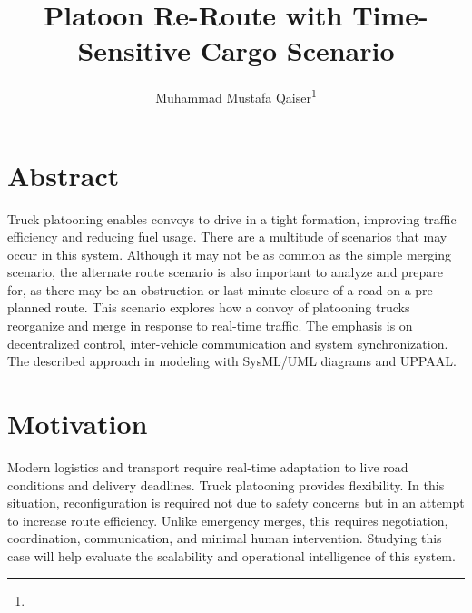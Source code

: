 \documentclass[english]{lni}
\begin{document}
\title[Titlel]{Platoon Re-Route with Time-Sensitive Cargo Scenario}
\author[Mu]{Muhammad Mustafa Qaiser\footnote{ } }

\maketitle
\tableofcontents


\newpage
\section{Abstract} 
Truck platooning enables convoys to drive in a tight formation, improving traffic efficiency and reducing fuel usage. \cite{10933391} There are a multitude of scenarios that may occur in this system. Although it may not be as common as the simple merging scenario, the alternate route scenario is also important to analyze and prepare for, as there may be an obstruction or last minute closure of a road on a pre planned route. This scenario explores how a convoy of platooning trucks reorganize and merge in response to real-time traffic. The emphasis is on decentralized control, inter-vehicle communication and system synchronization. The described approach in modeling with SysML/UML diagrams and UPPAAL. 

\section{Motivation}
Modern logistics and transport require real-time adaptation to live road conditions and delivery deadlines. Truck platooning provides flexibility. In this situation, reconfiguration is required not due to safety concerns but in an attempt to increase route efficiency. Unlike emergency merges, this requires negotiation, coordination, communication, and minimal human intervention. Studying this case will help evaluate the scalability and operational intelligence of this system.\cite{528248}
\end{document}
